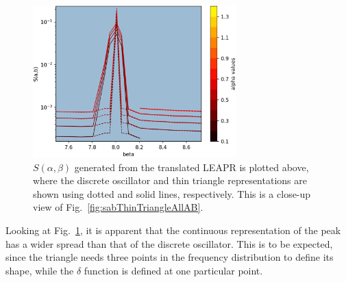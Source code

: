\documentclass[Master.tex]{subfiles}
\begin{document}
    \begin{figure}[h]
      \begin{center}
        \includegraphics[width=0.7\textwidth]{sab_thinTriangle_and_delta_all_AB_Zoomedb}
        \caption[Close-up view of $S(\alpha,\beta)$ grid that compares oscillator vs. thin triangle representation (translated LEAPR used)]{$S(\alpha,\beta)$ generated from the translated LEAPR is plotted above, where the discrete oscillator and thin triangle representations are shown using dotted and solid lines, respectively. This is a close-up view of Fig.~\ref{fig:sabThinTriangleAllAB}.}
        \label{fig:sabThinTriangleAllABZoomed}
      \end{center}
    \end{figure}
    Looking at Fig.~\ref{fig:sabThinTriangleAllABZoomed}, it is apparent that the continuous representation of the peak has a wider spread than that of the discrete oscillator. This is to be expected, since the triangle needs three points in the frequency distribution to define its shape, while the $\delta$ function is defined at one particular point. 



\end{document}

